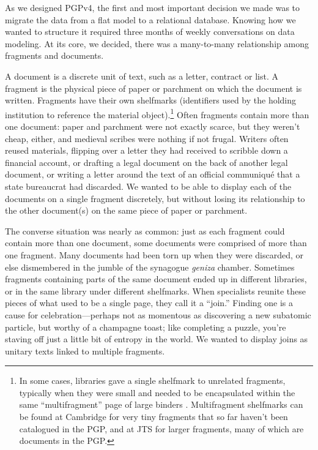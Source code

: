 \documentclass{article}
\begin{document}
As we designed PGPv4, the first and most important decision we made was to migrate the data from a flat model to a relational database. Knowing how we wanted to structure it required three months of weekly conversations on data modeling. At its core, we decided, there was a many-to-many relationship among fragments and documents. 

A document is a discrete unit of text, such as a letter, contract or list. A fragment is the physical piece of paper or parchment on which the document is written. Fragments have their own shelfmarks (identifiers used by the holding institution to reference the material object).\footnote{In some cases, libraries gave a single shelfmark to unrelated fragments, typically when they were small and needed to be encapsulated within the same “multifragment” page of large binders \autocite{katz_reuniting_2017}. Multifragment shelfmarks can be found at Cambridge for very tiny fragments that so far haven’t been catalogued in the PGP, and at JTS for larger fragments, many of which are documents in the PGP.} Often fragments contain more than one document: paper and parchment were not exactly scarce, but they weren’t cheap, either, and medieval scribes were nothing if not frugal. Writers often reused materials, flipping over a letter they had received to scribble down a financial account, or drafting a legal document on the back of another legal document, or writing a letter around the text of an official communiqué that a state bureaucrat had discarded. We wanted to be able to display each of the documents on a single fragment discretely, but without losing its relationship to the other document(s) on the same piece of paper or parchment. 

The converse situation was nearly as common: just as each fragment could contain more than one document, some documents were comprised of more than one fragment. Many documents had been torn up when they were discarded, or else dismembered in the jumble of the synagogue \textit{geniza} chamber. Sometimes fragments containing parts of the same document ended up in different libraries, or in the same library under different shelfmarks. When specialists reunite these pieces of what used to be a single page, they call it a “join.” Finding one is a cause for celebration—perhaps not as momentous as discovering a new subatomic particle, but worthy of a champagne toast; like completing a puzzle, you're staving off just a little bit of entropy in the world. We wanted to display joins as unitary texts linked to multiple fragments.
\end{document}
